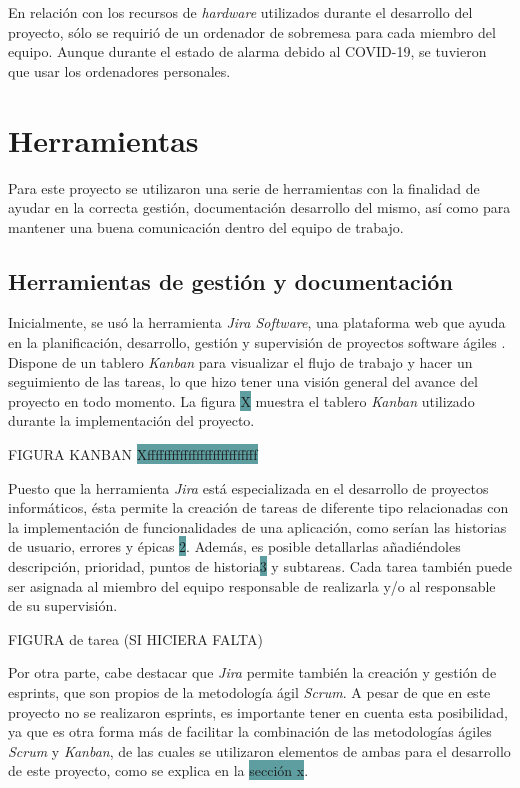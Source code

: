 \documentclass[pdftex,11pt,a4paper]{book}
\begin{document}
En relación con los recursos de \textit{hardware} utilizados durante el desarrollo del proyecto, sólo se requirió de un ordenador de sobremesa para cada miembro del equipo. Aunque durante el estado de alarma debido al COVID-19, se tuvieron que usar los ordenadores personales.

\section{Herramientas}

Para este proyecto se utilizaron una serie de herramientas con la finalidad de ayudar en la correcta gestión, documentación desarrollo del mismo, así como para mantener una buena comunicación dentro del equipo de trabajo.

\subsection{Herramientas de gestión y documentación} 

Inicialmente, se usó la herramienta \textit{Jira Software}, una plataforma web que ayuda en la planificación, desarrollo, gestión y supervisión de proyectos software ágiles \cite{bib:atlassian}. Dispone de un tablero \textit{Kanban} para visualizar el flujo de trabajo y hacer un seguimiento de las tareas, lo que hizo tener una visión general del avance del proyecto en todo momento. La figura \colorbox{CadetBlue}{X} muestra el tablero \textit{Kanban} utilizado durante la implementación del proyecto.

FIGURA KANBAN \colorbox{CadetBlue}{Xfffffffffffffffffffffffffff}

Puesto que la herramienta \textit{Jira} está especializada en el desarrollo de proyectos informáticos, ésta permite la creación de tareas de diferente tipo relacionadas con la implementación de funcionalidades de una aplicación, como serían las historias de usuario, errores y épicas \colorbox{CadetBlue}{2}. Además, es posible detallarlas añadiéndoles descripción, prioridad, puntos de historia\colorbox{CadetBlue}{3} y subtareas. Cada tarea también puede ser asignada al miembro del equipo responsable de realizarla y/o al responsable de su supervisión.

FIGURA de tarea (SI HICIERA FALTA)

Por otra parte, cabe destacar que \textit{Jira} permite también la creación y gestión de esprints, que son propios de la metodología ágil \textit{Scrum}. A pesar de que en este proyecto no se realizaron esprints, es importante tener en cuenta esta posibilidad, ya que es otra forma más de facilitar la combinación de las metodologías ágiles \textit{Scrum} y \textit{Kanban}, de las cuales se utilizaron elementos de ambas para el desarrollo de este proyecto, como se explica en la \colorbox{CadetBlue}{sección x}.
\end{document}
